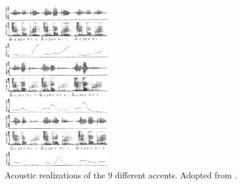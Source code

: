 \documentclass[a4paper,9pt]{beamer}
\theoremstyle{mytheoremstyle}
\begin{document}
\begin{frame}
\begin{figure}
\begin{center}
  \includegraphics[width=0.4\textwidth]{res/tonal_accents}
\end{center}
	\caption{Acoustic realizations of the 9 different accents. Adopted from \parencite{demenko1999}.}
\end{figure}
\end{frame}
\end{document}
